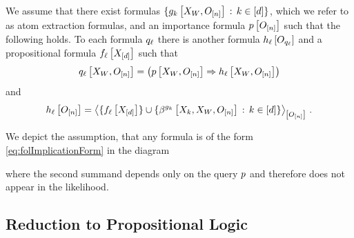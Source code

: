 \begin{assumption}
    \label{ass:propositionalHeads}
    We assume that there exist formulas $\{g_{k}\left[X_{W},O_{[n]}\right] \,:\, k\in[d]\}$, which we refer to as atom extraction formulas, and an importance formula $p\left[O_{[n]}\right]$ such that the following holds.
    To each \firstOrderLogic{} formula $q_{\ell}$ there is another \firstOrderLogic{} formula $h_{\ell}\left[O_{q_{\ell}}\right]$ and a propositional formula $f_{\ell}\left[X_{[d]}\right]$ such that
    \begin{align*}
        q_{\ell}\left[X_{W},O_{[n]}\right]
        = \left( p\left[X_{W},O_{[n]}\right] \Rightarrow h_{\ell}\left[X_{W},O_{[n]}\right] \right)
    \end{align*}
    and
    \begin{align*}
        \headfolformulaofat{\selindex}{\shortindvariables} =
        \contractionof{
            \{\enumformulaat{\shortcatvariables}\} \cup \{\bencodingofat{\extformulaof{\catenumerator}}{\catvariableof{\catenumerator},\worldvariables,\shortindvariables}
            \wcols \catenumeratorin\}
        }{\shortindvariables} \, .
    \end{align*}
\end{assumption}

We depict the assumption, that any formula is of the form \eqref{eq:folImplicationForm} in the diagram
\begin{center}
    
\end{center}
where the second summand depends only on the query $p$ and therefore does not appear in the likelihood.




\subsection{Reduction to Propositional Logic}

